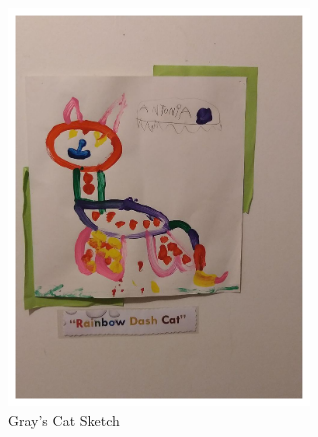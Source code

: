 \begin{centering}
\begin{figure}
	\includegraphics[width=8cm]{GrayCatPic.pdf}
  \caption{Gray's Cat Sketch}
  \label{Rainbow Dash Cat}
\end{figure}


\end{centering}

\clearpage
